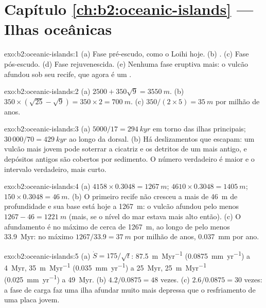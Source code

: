 \section*{Capítulo \ref{ch:b2:oceanic-islands} --- Ilhas oceânicas}

\begin{solution}{exo:b2:oceanic-islands:1}
(a) Fase pré-escudo, como o Loihi hoje. (b) . (c) Fase pós-escudo. (d) Fase
rejuvenescida. (e) Nenhuma fase eruptiva mais: o vulcão afundou sob seu recife, que agora é um .
\end{solution}

\begin{solution}{exo:b2:oceanic-islands:2}
(a) $2500 + 350\sqrt9 = \qty{3550}{m}$. (b) $350\times(\sqrt{25} - \sqrt9) = 350\times2 =
\qty{700}{m}$. (c) $350/(2\times5) = \qty{35}{m}$ por milhão de anos.
\end{solution}

\begin{solution}{exo:b2:oceanic-islands:3}
(a) $5000/17 = \qty{294}{kyr}$ em torno das ilhas principais; $30\,000/70 = \qty{429}{kyr}$ ao longo da
dorsal. (b) Há deslizamentos que escapam: um vulcão mais jovem pode soterrar a cicatriz e os detritos de um mais antigo,
e depósitos antigos são cobertos por sedimento. O número verdadeiro é maior e o intervalo verdadeiro,
mais curto.
\end{solution}

\begin{solution}{exo:b2:oceanic-islands:4}
(a) $4158\times0.3048 = \qty{1267}{m}$; $4610\times0.3048 = \qty{1405}{m}$; $150\times0.3048 =
\qty{46}{m}$. (b) O primeiro recife não cresceu a mais de \qty{46}{m} de profundidade e sua base está hoje a
\qty{1267}{m}: o vulcão afundou pelo menos $1267 - 46 = \qty{1221}{m}$ (mais, se o nível do mar
estava mais alto então). (c) O afundamento é no máximo de cerca de \qty{1267}{m}, ao longo de pelo menos \qty{33.9}{Myr}:
no máximo $1267/33.9 = \qty{37}{m}$ por milhão de anos, \qty{0.037}{mm} por ano.
\end{solution}

\begin{solution}{exo:b2:oceanic-islands:5}
(a) $\dot S = 175/\sqrt t$: \qty{87.5}{m.Myr^{-1}} (\qty{0.0875}{mm.yr^{-1}}) a \qty{4}{Myr},
\qty{35}{m.Myr^{-1}} (\qty{0.035}{mm.yr^{-1}}) a \qty{25}{Myr}, \qty{25}{m.Myr^{-1}}
(\qty{0.025}{mm.yr^{-1}}) a \qty{49}{Myr}. (b) $4.2/0.0875 = 48$ vezes. (c) $2.6/0.0875 = 30$
vezes: a fase de carga faz uma ilha afundar muito mais depressa que o resfriamento de uma placa jovem.
\end{solution}

